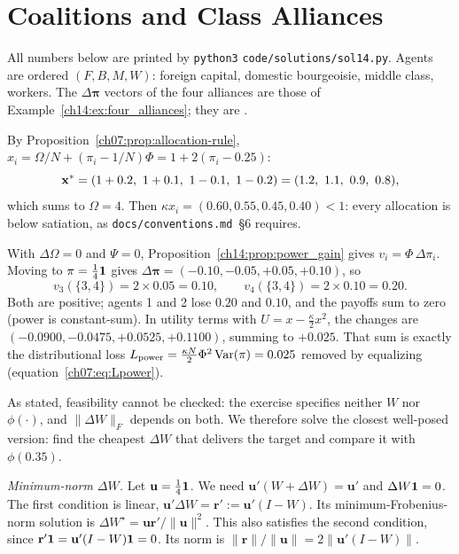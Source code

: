 \documentclass[../solutions_manual.tex]{subfiles}
\begin{document}
\ifSubfilesClassLoaded{\setcounter{chapter}{13}}{}%
\setcounter{chapter}{13}%
\chapter{Coalitions and Class Alliances}\label{sol14}
\sloppy

All numbers below are printed by \texttt{python3} \nolinkurl{code/solutions/sol14.py}. Agents are ordered $(F, B, M, W)$: foreign capital, domestic bourgeoisie, middle class, workers. The $\Delta\boldsymbol{\pi}$ vectors of the four alliances are those of Example~\ref{ch14:ex:four_alliances}; they are \illustrative.

 By Proposition~\ref{ch07:prop:allocation-rule}, $x_i = \Omega/N + (\pi_i - 1/N)\Phi = 1 + 2(\pi_i - 0.25)$:
\[
\mathbf{x}^* = (1 + 0.2,\ 1 + 0.1,\ 1 - 0.1,\ 1 - 0.2) = (1.2,\ 1.1,\ 0.9,\ 0.8),
\]
which sums to $\Omega = 4$. Then $\kappa x_i = (0.60, 0.55, 0.45, 0.40) < 1$: every allocation is below satiation, as \texttt{docs/conventions.md}~\S6 requires.

 With $\Delta\Omega = 0$ and $\Psi = 0$, Proposition~\ref{ch14:prop:power_gain} gives $v_i = \Phi\,\Delta\pi_i$. Moving to $\pi = \frac14\mathbf{1}$ gives $\Delta\boldsymbol{\pi} = (-0.10, -0.05, +0.05, +0.10)$, so
\[
v_3(\{3,4\}) = 2\times 0.05 = 0.10, \qquad v_4(\{3,4\}) = 2\times 0.10 = 0.20 .
\]
Both are positive; agents 1 and 2 lose $0.20$ and $0.10$, and the payoffs sum to zero (power is constant-sum). In utility terms with $U = x - \frac{\kappa}{2}x^2$, the changes are $(-0.0900, -0.0475, +0.0525, +0.1100)$, summing to $+0.025$. That sum is exactly the distributional loss $L_{\text{power}} = \frac{\kappa N}{2}\Phi^2\operatorname{Var}(\pi) = 0.025$ removed by equalizing (equation~\eqref{ch07:eq:Lpower}).

 As stated, feasibility cannot be checked: the exercise specifies neither $W$ nor $\phi(\cdot)$, and $\|\Delta W\|_F$ depends on both. We therefore solve the closest well-posed version: find the cheapest $\Delta W$ that delivers the target and compare it with $\phi(0.35)$.

\emph{Minimum-norm $\Delta W$.} Let $\mathbf{u} = \frac14\mathbf{1}$. We need $\mathbf{u}'(W + \Delta W) = \mathbf{u}'$ and $\Delta W\mathbf{1} = 0$. The first condition is linear, $\mathbf{u}'\Delta W = \mathbf{r}' := \mathbf{u}'(I - W)$. Its minimum-Frobenius-norm solution is $\Delta W^\star = \mathbf{u}\mathbf{r}'/\|\mathbf{u}\|^2$. This also satisfies the second condition, since $\mathbf{r}'\mathbf{1} = \mathbf{u}'(I - W)\mathbf{1} = 0$. Its norm is $\|\mathbf{r}\|/\|\mathbf{u}\| = 2\|\mathbf{u}'(I - W)\|$.
\end{document}
